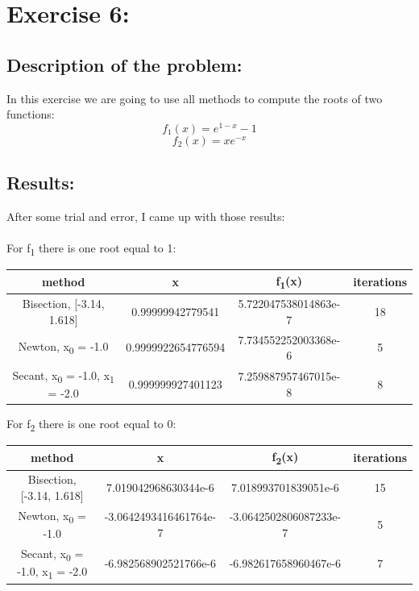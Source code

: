 \documentclass{article}
\begin{document}
\section*{Exercise 6:}
\subsection*{Description of the problem:}
In this exercise we are going to use all methods to compute the roots of two functions:
\[
    f_1(x)  = e^{1-x} -1
\]
\[
    f_2(x)  = xe^{-x}
\]

\subsection*{Results:}
After some trial and error, I came up with those results:
\\
\\
For f\textsubscript{1} there is one root equal to 1:
\begin{center}
    \begin{tabular}{| c | c | c | c |}
        \hline
         method & x & f\textsubscript{1}(x) & iterations \\ 
        \hline
        \hline
        Bisection, [-3.14, 1.618] & 0.99999942779541 & 5.722047538014863e-7 & 18 \\
        \hline
        Newton, x\textsubscript{0} = -1.0& 0.9999922654776594 & 7.734552252003368e-6 & 5\\
        \hline
        Secant, x\textsubscript{0} = -1.0, x\textsubscript{1} = -2.0 & 0.999999927401123 & 7.259887957467015e-8 & 8 \\
        \hline
    \end{tabular}
\end{center}
\newpage
For f\textsubscript{2} there is one root equal to 0:
\begin{center}
    \begin{tabular}{| c | c | c | c |}
        \hline
         method & x & f\textsubscript{2}(x) & iterations \\ 
        \hline
        \hline
        Bisection, [-3.14, 1.618] & 7.019042968630344e-6 & 7.018993701839051e-6 & 15 \\
        \hline
        Newton, x\textsubscript{0} = -1.0& -3.0642493416461764e-7 & -3.0642502806087233e-7 & 5\\
        \hline
        Secant, x\textsubscript{0} = -1.0, x\textsubscript{1} = -2.0 & -6.982568902521766e-6 & -6.982617658960467e-6 & 7 \\
        \hline
    \end{tabular}
\end{center}
\end{document}
